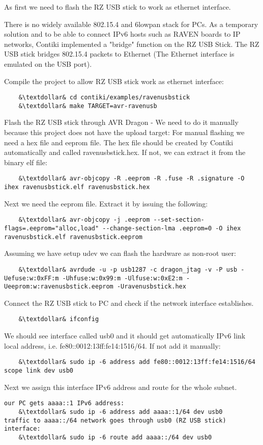 \documentclass{article}
\begin{document}
As first we need to flash the RZ USB stick to work as ethernet interface.

There is no widely available 802.15.4 and 6lowpan stack for PCs.
As a temporary solution and to be able to connect IPv6 hosts such as RAVEN boards to IP networks,
Contiki implemented a "bridge" function on the RZ USB Stick.
The RZ USB stick bridges 802.15.4 packets to Ethernet (The Ethernet interface is emulated on the USB port).


Compile the project to allow RZ USB stick work as ethernet interface:
\begin{lstlisting}
	&\textdollar& cd contiki/examples/ravenusbstick
	&\textdollar& make TARGET=avr-ravenusb
\end{lstlisting}

Flash the RZ USB stick through AVR Dragon - We need to do it manually because this project does not have the upload target:
For manual flashing we need a hex file and eeprom file. The hex file should be created by Contiki automatically and called ravenusbstick.hex.
If not, we can extract it from the binary elf file:
\begin{lstlisting}
	&\textdollar& avr-objcopy -R .eeprom -R .fuse -R .signature -O ihex ravenusbstick.elf ravenusbstick.hex
\end{lstlisting}
Next we need the eeprom file. Extract it by issuing the following:
\begin{lstlisting}
	&\textdollar& avr-objcopy -j .eeprom --set-section-flags=.eeprom="alloc,load" --change-section-lma .eeprom=0 -O ihex ravenusbstick.elf ravenusbstick.eeprom
\end{lstlisting}
Assuming we have setup udev we can flash the hardware as non-root user:
\begin{lstlisting}
	&\textdollar& avrdude -u -p usb1287 -c dragon_jtag -v -P usb -Uefuse:w:0xFF:m -Uhfuse:w:0x99:m -Ulfuse:w:0xE2:m -Ueeprom:w:ravenusbstick.eeprom -Uravenusbstick.hex
\end{lstlisting}

Connect the RZ USB stick to PC and check if the network interface establishes.
\begin{lstlisting}
	&\textdollar& ifconfig
\end{lstlisting}

We should see interface called usb0 and it should get automatically IPv6 link local address, i.e. fe80::0012:13ff:fe14:1516/64.
If not add it manually:
\begin{lstlisting}
	&\textdollar& sudo ip -6 address add fe80::0012:13ff:fe14:1516/64 scope link dev usb0
\end{lstlisting}
Next we assign this interface IPv6 address and route for the whole subnet.
\begin{lstlisting}
our PC gets aaaa::1 IPv6 address:
	&\textdollar& sudo ip -6 address add aaaa::1/64 dev usb0
traffic to aaaa::/64 network goes through usb0 (RZ USB stick) interface:
	&\textdollar& sudo ip -6 route add aaaa::/64 dev usb0
\end{lstlisting}
\end{document}
